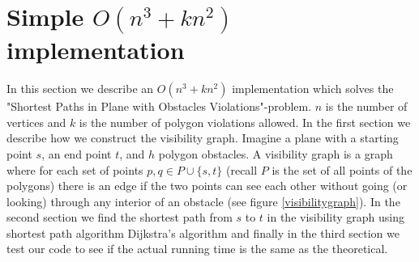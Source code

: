 \chapter{Simple $O(n^3 +k n^2)$ implementation}
In this section we describe an $O(n^3+k n^2)$ implementation which solves the
"Shortest Paths in Plane with Obstacles Violations"-problem. $n$ is the number
of vertices and $k$ is the number of polygon violations allowed. In the first
section we describe how we construct the visibility graph. Imagine a plane with
a starting point $s$, an end point $t$, and $h$ polygon obstacles. A visibility
graph is a graph where for each set of points  $p,q\in P \cup \{s,t\}$ (recall
$P$ is the set of all points of the polygons) there is an edge if the two points
can see each other without going (or looking) through any interior of an
obstacle (see figure \ref{visibilitygraph}). In the second section we find the
shortest path from $s$ to $t$ in the visibility graph using shortest path
algorithm Dijkstra's algorithm and finally in the third section we test our
code to see if the actual running time is the same as the theoretical.

